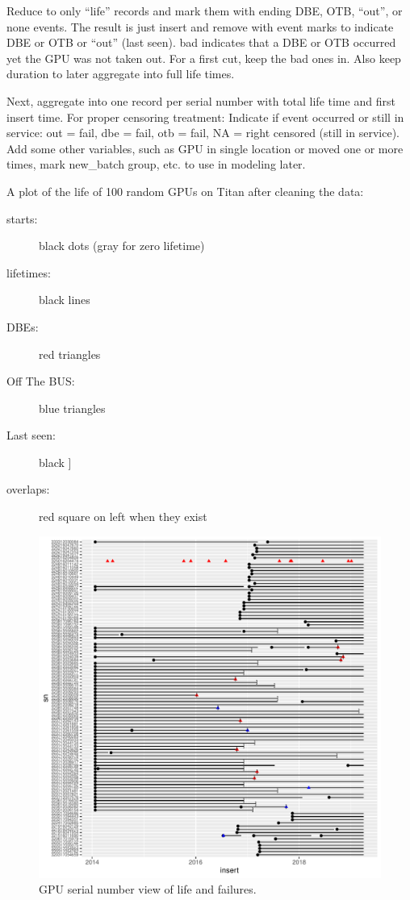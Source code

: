 Reduce to only “life” records and mark them with ending DBE, OTB,
“out”, or none events. The result is just insert and remove with event
marks to indicate DBE or OTB or “out” (last seen). bad indicates that
a DBE or OTB occurred yet the GPU was not taken out. For a first cut,
keep the bad ones in. Also keep duration to later aggregate into full
life times.

Next, aggregate into one record per serial number with total life time
and first insert time. For proper censoring treatment: Indicate if
event occurred or still in service: out = fail, dbe = fail, otb =
fail, NA = right censored (still in service). Add some other
variables, such as GPU in single location or moved one or more times,
mark new\_batch group, etc. to use in modeling later.

A plot of the life of 100 random GPUs on Titan after cleaning the data:
\begin{description}
\item[starts:] black dots (gray for zero lifetime)
\item[lifetimes:] black lines
\item[DBEs:] red triangles
\item[Off The BUS:] blue triangles
\item[Last seen:] black ]
\item[overlaps:] red square on left when they exist
\end{description}

\begin{figure}[ht]
  \includegraphics[width=6in]{sn.pdf}
  \caption{GPU serial number view of life and failures.}
\end{figure}



